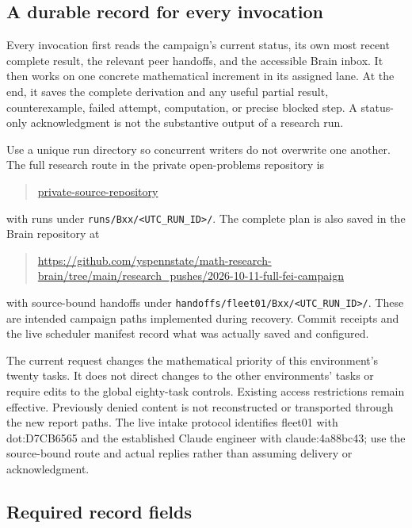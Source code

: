 \documentclass[11pt]{article}
\begin{document}
\subsection{A durable record for every invocation}

Every invocation first reads the campaign's current status, its own most recent complete result, the relevant peer handoffs, and the accessible Brain inbox. It then works on one concrete mathematical increment in its assigned lane. At the end, it saves the complete derivation and any useful partial result, counterexample, failed attempt, computation, or precise blocked step. A status-only acknowledgment is not the substantive output of a research run.

Use a unique run directory so concurrent writers do not overwrite one another. The full research route in the private open-problems repository is
\begin{quote}\small
\url{private-source-repository}
\end{quote}
with runs under \texttt{runs/Bxx/<UTC\_RUN\_ID>/}. The complete plan is also saved in the Brain repository at
\begin{quote}\small
\url{https://github.com/yspennstate/math-research-brain/tree/main/research_pushes/2026-10-11-full-fei-campaign}
\end{quote}
with source-bound handoffs under \texttt{handoffs/fleet01/Bxx/<UTC\_RUN\_ID>/}. These are intended campaign paths implemented during recovery. Commit receipts and the live scheduler manifest record what was actually saved and configured.

The current request changes the mathematical priority of this environment's twenty tasks. It does not direct changes to the other environments' tasks or require edits to the global eighty-task controls. Existing access restrictions remain effective. Previously denied content is not reconstructed or transported through the new report paths. The live intake protocol identifies fleet01 with dot:D7CB6565 and the established Claude engineer with claude:4a88bc43; use the source-bound route and actual replies rather than assuming delivery or acknowledgment.

\subsection{Required record fields}
\end{document}
